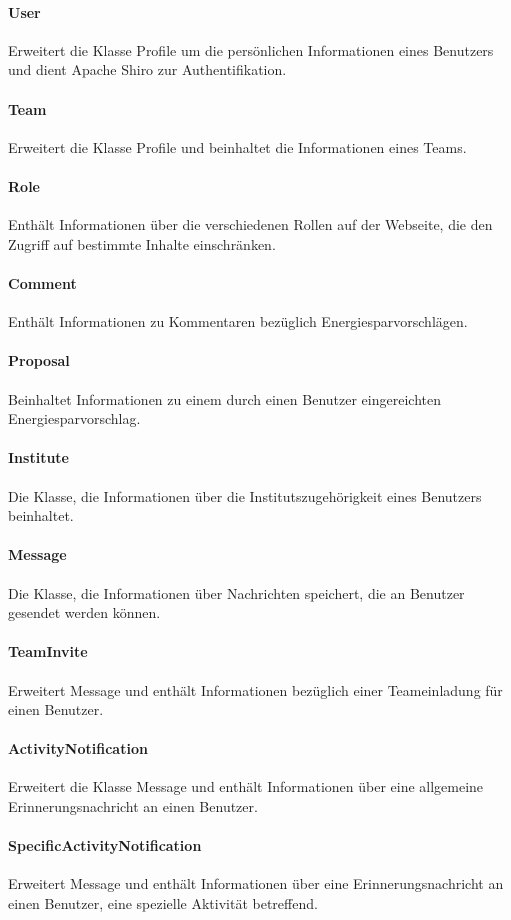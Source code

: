 	\paragraph{User}Erweitert die Klasse Profile um die pers\"onlichen Informationen eines Benutzers und dient Apache Shiro zur Authentifikation.
	\paragraph{Team}Erweitert die Klasse Profile und beinhaltet die Informationen eines Teams.
	\paragraph{Role}Enth\"alt Informationen \"uber die verschiedenen Rollen auf der Webseite, die den Zugriff auf bestimmte Inhalte einschr\"anken.
	\paragraph{Comment}Enth\"alt Informationen zu Kommentaren bez\"uglich Energiesparvorschl\"agen.
	\paragraph{Proposal}Beinhaltet Informationen zu einem durch einen Benutzer eingereichten Energiesparvorschlag.
	\paragraph{Institute}Die Klasse, die Informationen \"uber die Institutszugeh\"origkeit eines Benutzers beinhaltet.
	\paragraph{Message}Die Klasse, die Informationen \"uber Nachrichten speichert, die an Benutzer gesendet werden können.
	\paragraph{TeamInvite}Erweitert Message und enth\"alt Informationen bez\"uglich einer Teameinladung f\"ur einen Benutzer.
	\paragraph{ActivityNotification}Erweitert die Klasse Message und enth\"alt Informationen \"uber eine allgemeine Erinnerungsnachricht an einen Benutzer.
	\paragraph{SpecificActivityNotification}Erweitert Message und enth\"alt Informationen \"uber eine Erinnerungsnachricht an einen Benutzer, eine spezielle Aktivit\"at betreffend.

